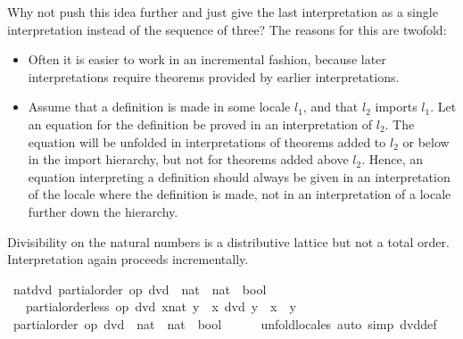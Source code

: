 \begin{isabellebody}
\begin{isamarkuptext}
  Why not push this idea further and just give the last interpretation
  as a single interpretation instead of the sequence of three?  The
  reasons for this are twofold:
\begin{itemize}
\item
  Often it is easier to work in an incremental fashion, because later
  interpretations require theorems provided by earlier
  interpretations.
\item
  Assume that a definition is made in some locale $l_1$, and that $l_2$
  imports $l_1$.  Let an equation for the definition be
  proved in an interpretation of $l_2$.  The equation will be unfolded
  in interpretations of theorems added to $l_2$ or below in the import
  hierarchy, but not for theorems added above $l_2$.
  Hence, an equation interpreting a definition should always be given in
  an interpretation of the locale where the definition is made, not in
  an interpretation of a locale further down the hierarchy.
\end{itemize}%
\end{isamarkuptext}%
\isamarkuptrue%
%
\isamarkuptrue%
%
\begin{isamarkuptext}%
Divisibility on the natural numbers is a distributive lattice
  but not a total order.  Interpretation again proceeds
  incrementally.%
\end{isamarkuptext}%
\isamarkuptrue%
\isamarkupfalse%
\ nat{\isacharunderscore}dvd{\isacharcolon}\ partial{\isacharunderscore}order\ {\isachardoublequoteopen}op\ dvd\ {\isacharcolon}{\isacharcolon}\ nat\ {\isasymRightarrow}\ nat\ {\isasymRightarrow}\ bool{\isachardoublequoteclose}\isanewline
\ \ \ {\isachardoublequoteopen}partial{\isacharunderscore}order{\isachardot}less\ op\ dvd\ {\isacharparenleft}x{\isacharcolon}{\isacharcolon}nat{\isacharparenright}\ y\ {\isacharequal}\ {\isacharparenleft}x\ dvd\ y\ {\isasymand}\ x\ {\isasymnoteq}\ y{\isacharparenright}{\isachardoublequoteclose}\isanewline
%
\isadelimproof
%
\endisadelimproof
%
\isatagproof
{}\isamarkupfalse%
\ {\isacharminus}\isanewline
\ \ \isamarkupfalse%
\ {\isachardoublequoteopen}partial{\isacharunderscore}order\ {\isacharparenleft}op\ dvd\ {\isacharcolon}{\isacharcolon}\ nat\ {\isasymRightarrow}\ nat\ {\isasymRightarrow}\ bool{\isacharparenright}{\isachardoublequoteclose}\isanewline
\ \ \ \ \isamarkupfalse%
\ unfold{\isacharunderscore}locales\ {\isacharparenleft}auto\ simp{\isacharcolon}\ dvd{\isacharunderscore}def{\isacharparenright}\isanewline

\end{isabellebody}

